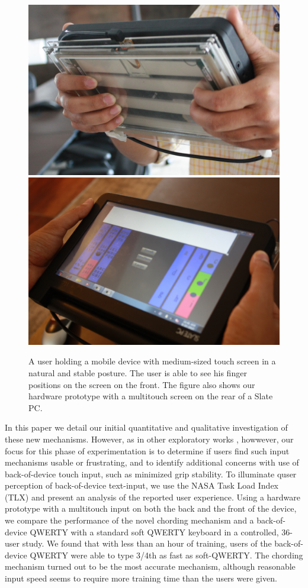 \begin{figure}
    \includegraphics[scale=0.43]{Figures/natural1.pdf} 
     \includegraphics[scale=0.43]{Figures/natural2.pdf} 
     \caption{A user holding a mobile device with medium-sized touch
       screen in a natural and stable posture. The user is able to see
       his finger positions on the screen on the front. The figure
       also shows our hardware prototype with a multitouch screen on
       the rear of a Slate PC.}
        \label{fig:natural}
\end{figure}

In this paper we detail our initial quantitative and qualitative
investigation of these new mechanisms. However, as in other
exploratory works \cite{RearType}, howwever, our focus for this phase
of experimentation is to determine if users find such input mechanisms
usable or frustrating, and to identify additional concerns with use of
back-of-device touch input, such as minimized grip stability. To
illuminate quser perception of back-of-device text-input, we use the
NASA Task Load Index (TLX) and present an analysis of the reported
user experience. Using a hardware prototype with a multitouch input on
both the back and the front of the device, we compare the performance
of the novel chording mechanism and a back-of-device QWERTY with a
standard soft QWERTY keyboard in a controlled, 36-user study. We found that with less than an hour
of training, users of the back-of-device QWERTY were able to type
3/4th as fast as soft-QWERTY.  The chording mechanism turned out to be
the most accurate mechanism, although reasonable input speed seems to
require more training time than the users were given.
